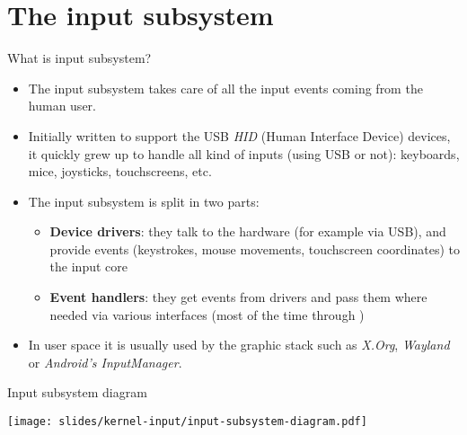 \section{The input subsystem}

\begin{frame}{What is input subsystem?}
  \begin{itemize}
  \item The input subsystem takes care of all the input events coming
    from the human user.
  \item Initially written to support the USB {\em HID} (Human
    Interface Device) devices, it quickly grew up to handle all kind
    of inputs (using USB or not): keyboards, mice, joysticks,
    touchscreens, etc.
  \item The input subsystem is split in two parts:
    \begin{itemize}
    \item {\bf Device drivers}: they talk to the hardware (for example
      via USB), and provide events (keystrokes, mouse movements,
      touchscreen coordinates) to the input core
    \item {\bf Event handlers}: they get events from drivers and pass
      them where needed via various interfaces (most of the time
      through )
    \end{itemize}
  \item In user space it is usually used by the graphic stack such
    as {\em X.Org}, {\em Wayland} or {\em Android's InputManager}.
  \end{itemize}
\end{frame}

\begin{frame}{Input subsystem diagram}
  \begin{center}
    \texttt{[image: slides/kernel-input/input-subsystem-diagram.pdf]}
  \end{center}
\end{frame}

